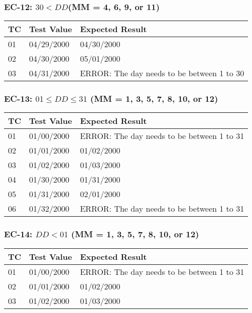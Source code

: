 \documentclass[11pt, oneside]{article}   	%
\begin{document}
\subsubsection{EC-12: $30 < DD$(MM = 4, 6, 9, or 11)}
\begin{table}[H]
\begin{tabular}{|l|l|l|}
\hline
TC & Test Value & Expected Result                            \\ \hline
01 & 04/29/2000 & 04/30/2000                                 \\ \hline
02 & 04/30/2000 & 05/01/2000                                 \\ \hline
03 & 04/31/2000 & ERROR: The day needs to be between 1 to 30 \\ \hline
\end{tabular}
\end{table}

\subsubsection{EC-13: $01 \leq DD \leq 31$ (MM = 1, 3, 5, 7, 8, 10, or 12)}
\begin{table}[H]
\begin{tabular}{|l|l|l|}
\hline
TC & Test Value & Expected Result                            \\ \hline
01 & 01/00/2000 & ERROR: The day needs to be between 1 to 31 \\ \hline
02 & 01/01/2000 & 01/02/2000                                 \\ \hline
03 & 01/02/2000 & 01/03/2000                                 \\ \hline
04 & 01/30/2000 & 01/31/2000                                 \\ \hline
05 & 01/31/2000 & 02/01/2000                                 \\ \hline
06 & 01/32/2000 & ERROR: The day needs to be between 1 to 31 \\ \hline
\end{tabular}
\end{table}

\subsubsection{EC-14: $DD < 01$ (MM = 1, 3, 5, 7, 8, 10, or 12)}
\begin{table}[H]
\begin{tabular}{|l|l|l|}
\hline
TC & Test Value & Expected Result                            \\ \hline
01 & 01/00/2000 & ERROR: The day needs to be between 1 to 31 \\ \hline
02 & 01/01/2000 & 01/02/2000                                 \\ \hline
03 & 01/02/2000 & 01/03/2000                                 \\ \hline
\end{tabular}
\end{table}
\end{document}
